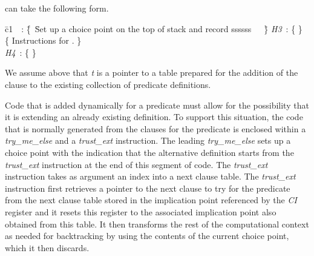 can take the following form.
\begin{tabbing}
\quad\= c1\ \ : \=\{\ \=Set up a choice point on the top of stack and record ssssss\ \ \ \=\}\kill
\> {\it H3}\ : \>\{                                                                     \>\} \\
\>             \>\{ \>Instructions for .                                                 \>\} \\
\> {\it H4}\ : \>\{                                                                      \>\}
\end{tabbing}
We assume above that {\it t} is a pointer to a table prepared for the
addition of the clause  to the existing collection of
predicate definitions.

Code that is added dynamically for a predicate must allow for the
possibility that it is extending an already existing definition. To
support this situation, the code that is normally generated from the
clauses for the predicate is enclosed within a
{\it try\_me\_else} and a {\it trust\_ext} instruction. The leading
{\it try\_me\_else} sets up a choice point with the indication that
the alternative definition starts from the {\it trust\_ext}
instruction at the end of this segment of code.
The {\it trust\_ext} instruction takes as argument an index into a
next clause table.
The {\it trust\_ext} instruction first retrieves a pointer to the next
clause to try for the predicate from the next clause table stored in
the implication point referenced by the {\it CI} register and it
resets this register to the associated implication point also obtained
from this table. It then transforms the rest of the computational
context as needed for backtracking by using the contents of the
current choice point, which it then discards.

